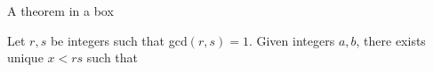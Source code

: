 \documentclass{beamer}
\begin{document}
    \begin{frame}{A theorem in a box}
        \begin{theorem}
         Let $r, s$ be integers such that gcd$(r, s)=1$. 
        Given integers $a,b$, there exists unique 
        $x <rs$ such that 
        \end{theorem} 
    \end{frame} 
\end{document}
